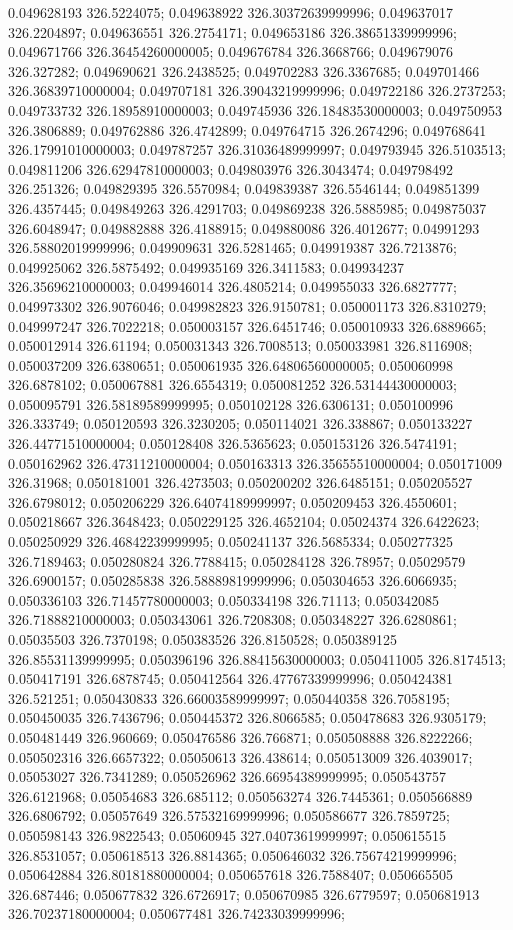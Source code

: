 0.049628193 326.5224075; 0.049638922 326.30372639999996; 0.049637017 326.2204897; 0.049636551 326.2754171; 0.049653186 326.38651339999996; 0.049671766 326.36454260000005; 0.049676784 326.3668766; 0.049679076 326.327282; 0.049690621 326.2438525; 0.049702283 326.3367685; 0.049701466 326.36839710000004; 0.049707181 326.39043219999996; 0.049722186 326.2737253; 0.049733732 326.18958910000003; 0.049745936 326.18483530000003; 0.049750953 326.3806889; 0.049762886 326.4742899; 0.049764715 326.2674296; 0.049768641 326.17991010000003; 0.049787257 326.31036489999997; 0.049793945 326.5103513; 0.049811206 326.62947810000003; 0.049803976 326.3043474; 0.049798492 326.251326; 0.049829395 326.5570984; 0.049839387 326.5546144; 0.049851399 326.4357445; 0.049849263 326.4291703; 0.049869238 326.5885985; 0.049875037 326.6048947; 0.049882888 326.4188915; 0.049880086 326.4012677; 0.04991293 326.58802019999996; 0.049909631 326.5281465; 0.049919387 326.7213876; 0.049925062 326.5875492; 0.049935169 326.3411583; 0.049934237 326.35696210000003; 0.049946014 326.4805214; 0.049955033 326.6827777; 0.049973302 326.9076046; 0.049982823 326.9150781; 0.050001173 326.8310279; 0.049997247 326.7022218; 0.050003157 326.6451746; 0.050010933 326.6889665; 0.050012914 326.61194; 0.050031343 326.7008513; 0.050033981 326.8116908; 0.050037209 326.6380651; 0.050061935 326.64806560000005; 0.050060998 326.6878102; 0.050067881 326.6554319; 0.050081252 326.53144430000003; 0.050095791 326.58189589999995; 0.050102128 326.6306131; 0.050100996 326.333749; 0.050120593 326.3230205; 0.050114021 326.338867; 0.050133227 326.44771510000004; 0.050128408 326.5365623; 0.050153126 326.5474191; 0.050162962 326.47311210000004; 0.050163313 326.35655510000004; 0.050171009 326.31968; 0.050181001 326.4273503; 0.050200202 326.6485151; 0.050205527 326.6798012; 0.050206229 326.64074189999997; 0.050209453 326.4550601; 0.050218667 326.3648423; 0.050229125 326.4652104; 0.05024374 326.6422623; 0.050250929 326.46842239999995; 0.050241137 326.5685334; 0.050277325 326.7189463; 0.050280824 326.7788415; 0.050284128 326.78957; 0.05029579 326.6900157; 0.050285838 326.58889819999996; 0.050304653 326.6066935; 0.050336103 326.71457780000003; 0.050334198 326.71113; 0.050342085 326.71888210000003; 0.050343061 326.7208308; 0.050348227 326.6280861; 0.05035503 326.7370198; 0.050383526 326.8150528; 0.050389125 326.85531139999995; 0.050396196 326.88415630000003; 0.050411005 326.8174513; 0.050417191 326.6878745; 0.050412564 326.47767339999996; 0.050424381 326.521251; 0.050430833 326.66003589999997; 0.050440358 326.7058195; 0.050450035 326.7436796; 0.050445372 326.8066585; 0.050478683 326.9305179; 0.050481449 326.960669; 0.050476586 326.766871; 0.050508888 326.8222266; 0.050502316 326.6657322; 0.05050613 326.438614; 0.050513009 326.4039017; 0.05053027 326.7341289; 0.050526962 326.66954389999995; 0.050543757 326.6121968; 0.05054683 326.685112; 0.050563274 326.7445361; 0.050566889 326.6806792; 0.05057649 326.57532169999996; 0.050586677 326.7859725; 0.050598143 326.9822543; 0.05060945 327.04073619999997; 0.050615515 326.8531057; 0.050618513 326.8814365; 0.050646032 326.75674219999996; 0.050642884 326.80181880000004; 0.050657618 326.7588407; 0.050665505 326.687446; 0.050677832 326.6726917; 0.050670985 326.6779597; 0.050681913 326.70237180000004; 0.050677481 326.74233039999996; 